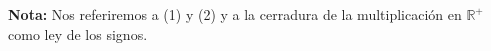 \documentclass[11pt]{article}
\newcommand{\R}{\mathbb{R}}
\begin{document}
\begin{enumerate}[label=\alph*)]
    \textbf{Nota:} Nos referiremos a (1) y (2) y a la cerradura de la multiplicación en $\R^+$ como ley de los signos.    


\end{enumerate}
\end{document}
